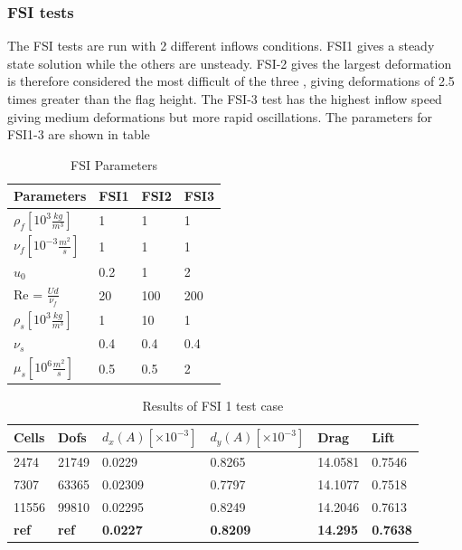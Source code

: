 \subsubsection*{FSI tests}
The FSI tests are run with 2 different inflows conditions. FSI1 gives a steady state solution while the others are unsteady. FSI-2 gives the largest deformation is therefore considered the most difficult of the three \cite{Richter2013}, giving deformations of 2.5 times greater than the flag height. The FSI-3 test has the highest inflow speed giving medium deformations but more rapid oscillations. The parameters for FSI1-3 are shown in table


\begin{table}[h!]
\centering
\caption{FSI Parameters}
\label{my-label}
\begin{tabular}{|l|l|l|l|}
\hline
Parameters & FSI1 & FSI2 & FSI3 \\ \hline
$\rho_f[10^3 \frac{kg}{m^3}]$ & 1 & 1 & 1 \\ \hline
$\nu_f [10^{-3} \frac{m^2}{s}]$ & 1 & 1 & 1 \\ \hline
$u_0$ & 0.2 & 1 & 2 \\ \hline
Re = $\frac{U d}{\nu_f}$ & 20 & 100 & 200 \\ \hline
$\rho_s[10^3 \frac{kg}{m^3}]$ & 1 & 10 & 1 \\ \hline
$\nu_s$ & 0.4 & 0.4 & 0.4 \\ \hline
$\mu_s[10^6 \frac{m^2}{s}]$ & 0.5 & 0.5 & 2 \\ \hline
\end{tabular}
\end{table}

\begin{table}[H]
\centering
\caption{Results of FSI 1 test case}
\label{my-label}
\begin{tabular}{|l|l|l|l|l|l|}
\hline
Cells & Dofs & $d_x(A) [\times10^{-3}]$ & $d_y(A)[\times10^{-3}]$ & Drag & Lift \\ \hline
2474 & 21749 & 0.0229 & 0.8265 & 14.0581 & 0.7546 \\ \hline
7307 & 63365 & 0.02309 & 0.7797 & 14.1077 & 0.7518 \\ \hline
11556 & 99810 & 0.02295 & 0.8249 & 14.2046 & 0.7613 \\ \hline
\textbf{ref} & \textbf{ref} & \textbf{0.0227} & \textbf{0.8209} & \textbf{14.295} & \textbf{0.7638} \\ \hline
\end{tabular}
\end{table}

